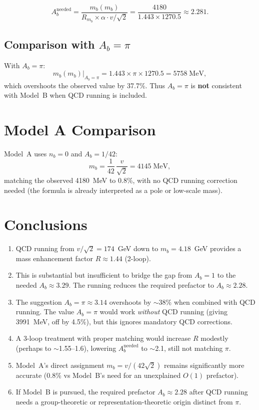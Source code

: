 \documentclass[11pt]{article}
\begin{document}
\begin{equation}
  A_b^{\text{needed}} = \frac{m_b(m_b)}{R_{m_b} \times \alpha \cdot v/\sqrt{2}}
  = \frac{4180}{1.443 \times 1270.5}
  \approx 2.281.
\end{equation}

\subsection{Comparison with $A_b = \pi$}

With $A_b = \pi$:
\begin{equation}
  m_b(m_b)\big|_{A_b=\pi} = 1.443 \times \pi \times 1270.5
  = 5758 \;\text{MeV},
\end{equation}
which overshoots the observed value by 37.7\%.
Thus $A_b = \pi$ is \textbf{not} consistent with Model~B when
QCD running is included.

\section{Model A Comparison}

Model~A uses $n_b = 0$ and $A_b = 1/42$:
\begin{equation}
  m_b = \frac{1}{42}\,\frac{v}{\sqrt{2}} = 4145 \;\text{MeV},
\end{equation}
matching the observed 4180~MeV to 0.8\%, with no QCD running
correction needed (the formula is already interpreted as a pole or
low-scale mass).

\section{Conclusions}

\begin{enumerate}
\item QCD running from $v/\sqrt{2} = 174$~GeV down to $m_b = 4.18$~GeV
      provides a mass enhancement factor $R \approx 1.44$ (2-loop).
\item This is substantial but insufficient to bridge the gap from
      $A_b = 1$ to the needed $A_b \approx 3.29$.  The running
      reduces the required prefactor to $A_b \approx 2.28$.
\item The suggestion $A_b = \pi \approx 3.14$ overshoots by $\sim$38\%
      when combined with QCD running.  The value $A_b = \pi$ would
      work \emph{without} QCD running (giving 3991~MeV, off by 4.5\%),
      but this ignores mandatory QCD corrections.
\item A 3-loop treatment with proper matching would increase $R$
      modestly (perhaps to $\sim$1.55--1.6), lowering $A_b^{\text{needed}}$
      to $\sim$2.1, still not matching $\pi$.
\item Model~A's direct assignment $m_b = v/(42\sqrt{2})$ remains
      significantly more accurate (0.8\% vs Model~B's need for an
      unexplained $O(1)$ prefactor).
\item If Model~B is pursued, the required prefactor $A_b \approx 2.28$
      after QCD running needs a group-theoretic or representation-theoretic
      origin distinct from $\pi$.
\end{enumerate}
\end{document}
